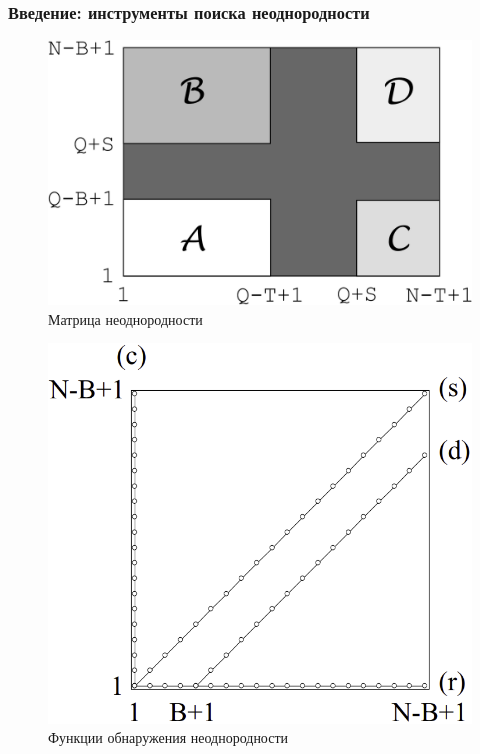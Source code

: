 \documentclass[pdf, 9pt,intlimits, unicode]{beamer}
\begin{document}
	\begin{frame}
		\frametitle{Введение: инструменты поиска неоднородности}	
		\begin{multicols}{2}
			
			\begin{figure}
				\center
				\includegraphics[width=\linewidth, height=0.8\linewidth]{imgs/H-matrix}\caption{Матрица неоднородности}\par 
			\end{figure}
			\begin{figure}
				\center
				\includegraphics[width=\linewidth, height=0.8\linewidth]{imgs/det_funcs}
				\caption{Функции обнаружения неоднородности}\par 
			\end{figure}
			

\end{multicols}
\end{frame}
\end{document}
